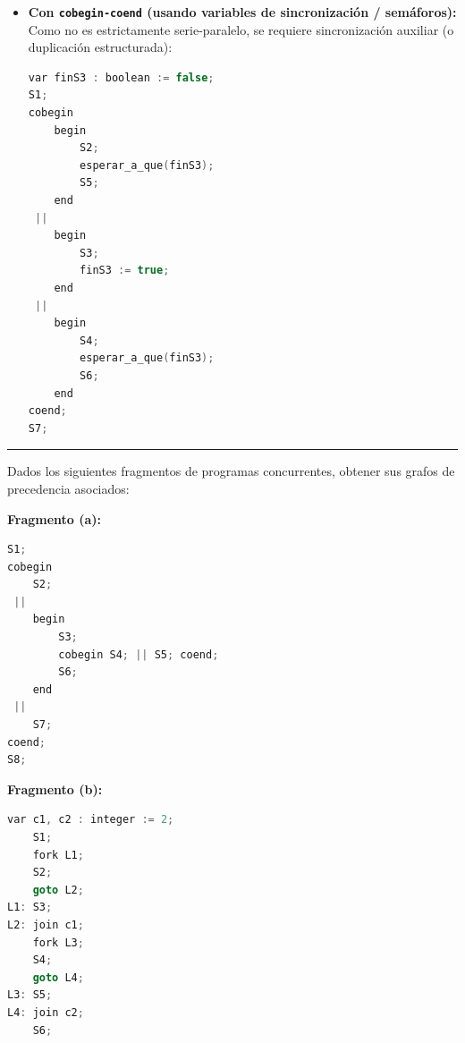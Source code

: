 \documentclass[11pt,a4paper,twoside,openright]{report}
\begin{document}
\begin{solucion}
\begin{itemize}[leftmargin=*]
\begin{lstlisting}[language=C++]
L_S5:
    S5;
    join c7;
    goto L_S7;

L_S6:
    S6;
    join c7;
    goto L_S7;

L_S7:
    S7;
\end{lstlisting}

    \item \textbf{Con \texttt{cobegin-coend} (usando variables de sincronización / semáforos):} Como no es estrictamente serie-paralelo, se requiere sincronización auxiliar (o duplicación estructurada):
\begin{lstlisting}[language=C++]
var finS3 : boolean := false;
S1;
cobegin
    begin
        S2;
        esperar_a_que(finS3);
        S5;
    end
 ||
    begin
        S3;
        finS3 := true;
    end
 ||
    begin
        S4;
        esperar_a_que(finS3);
        S6;
    end
coend;
S7;
\end{lstlisting}
\end{itemize}
\end{solucion}

\vspace{15pt}
\hrule
\vspace{15pt}

\begin{ejercicio}
Dados los siguientes fragmentos de programas concurrentes, obtener sus grafos de precedencia asociados:

\begin{minipage}{0.48\textwidth}
\textbf{Fragmento (a):}
\begin{lstlisting}[language=C++]
S1;
cobegin
    S2;
 ||
    begin
        S3;
        cobegin S4; || S5; coend;
        S6;
    end
 ||
    S7;
coend;
S8;
\end{lstlisting}
\end{minipage}\hfill
\begin{minipage}{0.48\textwidth}
\textbf{Fragmento (b):}
\begin{lstlisting}[language=C++]
    var c1, c2 : integer := 2;
    S1;
    fork L1;
    S2;
    goto L2;
L1: S3;
L2: join c1;
    fork L3;
    S4;
    goto L4;
L3: S5;
L4: join c2;
    S6;
\end{lstlisting}
\end{minipage}
\end{ejercicio}
\end{document}
